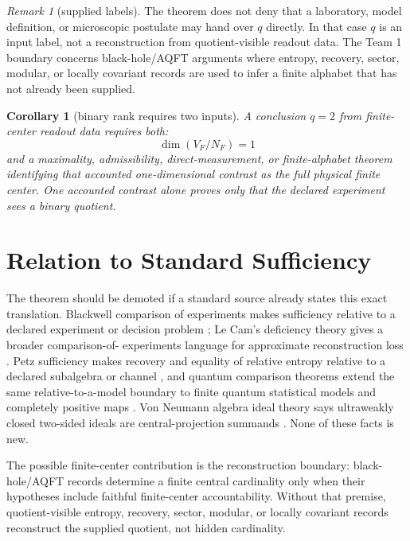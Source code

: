 \documentclass[12pt]{article}
\newtheorem{corollary}{Corollary}
\theoremstyle{definition}
\theoremstyle{remark}
\newtheorem{remark}{Remark}
\begin{document}
\begin{remark}[supplied labels]
The theorem does not deny that a laboratory, model definition, or microscopic
postulate may hand over \(q\) directly.  In that case \(q\) is an input label,
not a reconstruction from quotient-visible readout data.  The Team 1 boundary
concerns black-hole/AQFT arguments where entropy, recovery, sector, modular, or
locally covariant records are used to infer a finite alphabet that has not
already been supplied.
\end{remark}

\begin{corollary}[binary rank requires two inputs]
\label{cor:binary}
A conclusion \(q=2\) from finite-center readout data requires both:
\[
  \dim(V_F/N_F)=1
\]
and a maximality, admissibility, direct-measurement, or finite-alphabet theorem
identifying that accounted one-dimensional contrast as the full physical
finite center.  One accounted contrast alone proves only that the declared
experiment sees a binary quotient.
\end{corollary}

\section{Relation to Standard Sufficiency}

The theorem should be demoted if a standard source already states this exact
translation.  Blackwell comparison of experiments makes sufficiency relative
to a declared experiment or decision problem \cite{Blackwell1951,
Blackwell1953}; Le Cam's deficiency theory gives a broader comparison-of-
experiments language for approximate reconstruction loss \cite{LeCam1964,
LeCam1986}.  Petz sufficiency makes recovery and equality of relative entropy
relative to a declared subalgebra or channel \cite{Petz1986,Petz1988}, and
quantum comparison theorems extend the same relative-to-a-model boundary to
finite quantum statistical models and completely positive maps
\cite{Shmaya2005,Buscemi2012}.
Von Neumann algebra ideal theory says ultraweakly closed two-sided ideals are
central-projection summands \cite{LurieVN,HoudayerVN}.  None of these facts is
new.

The possible finite-center contribution is the reconstruction boundary:
black-hole/AQFT records determine a finite central cardinality only when their
hypotheses include faithful finite-center accountability.  Without that
premise, quotient-visible entropy, recovery, sector, modular, or locally
covariant records reconstruct the supplied quotient, not hidden cardinality.
\end{document}
